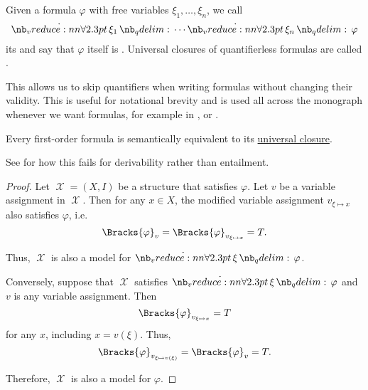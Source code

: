 \begin{definition}\label{def:universal_closure}
  Given a formula \( \varphi \) with free variables \( \xi_1, \ldots, \xi_n \), we call
  \begin{equation*}
    \qforall {\xi_1} \cdots \qforall {\xi_n} \varphi
  \end{equation*}
  its  and say that \( \varphi \) itself is . Universal closures of quantifierless formulas are called .
\end{definition}
\begin{comments}
  \item This allows us to skip quantifiers when writing formulas without changing their validity. This is useful for notational brevity and is used all across the monograph whenever we want  formulas, for example in ,  or .
\end{comments}

\begin{proposition}\label{thm:implicit_universal_quantification}
  Every first-order formula is semantically equivalent to its \hyperref[def:universal_closure]{universal closure}.
\end{proposition}
\begin{comments}
  \item See  for how this fails for derivability rather than entailment.
\end{comments}
\begin{proof}
  \SufficiencySubProof Let \( \mscrX = (X, I) \) be a structure that satisfies \( \varphi \). Let \( v \) be a variable assignment in \( \mscrX \). Then for any \( x \in X \), the modified variable assignment \( v_{\xi \mapsto x} \) also satisfies \( \varphi \), i.e.
  \begin{equation*}
    \Bracks{\varphi}_v = \Bracks{\varphi}_{v_{\xi \mapsto x}} = T.
  \end{equation*}

  Thus, \( \mscrX \) is also a model for \( \qforall \xi \varphi \).

  \NecessitySubProof Conversely, suppose that \( \mscrX \) satisfies \( \qforall \xi \varphi \) and \( v \) is any variable assignment. Then
  \begin{equation*}
    \Bracks{\varphi}_{v_{\xi \mapsto x}} = T
  \end{equation*}
  for any \( x \), including \( x = v(\xi) \). Thus,
  \begin{equation*}
    \Bracks{\varphi}_{v_{\xi \mapsto v(\xi)}} = \Bracks{\varphi}_v = T.
  \end{equation*}

  Therefore, \( \mscrX \) is also a model for \( \varphi \).
\end{proof}

